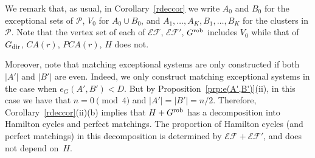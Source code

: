 \documentclass{memo-l}
\def\cP{\mathcal{P}}
\numberwithin{section}{chapter}
\numberwithin{equation}{section}
\numberwithin{firstthm}{section}
\numberwithin{figure}{section}
\begin{document}
We remark that, as usual, in Corollary~\ref{rdeccor} we write $A_0$ and $B_0$ for the exceptional sets of $\cP$, $V_0$ for $A_0\cup B_0$, and
$A_1,\dots,A_K,B_1,\dots,B_K$ for the clusters in $\cP$. Note that the vertex set of each of $\mathcal{EF}$, $\mathcal{EF}'$, $G^{\rm rob}$
includes $V_0$ while that of $G_{\rm dir}$, $CA(r)$, $PCA(r)$, $H$ does not.

Moreover, note that matching exceptional systems are only constructed if both $|A'|$ and $|B'|$ are even.
Indeed, we only construct matching exceptional systems in the case when $e_G(A',B')  < D$.
But by Proposition~\ref{prp:e(A',B')}(ii), in this case we have that $n = 0 \pmod4$ and $|A'| = |B'| = n/2$.
Therefore, Corollary~\ref{rdeccor}(ii)(b) implies that $H+ G^{\rm rob}$ has a decomposition into Hamilton cycles and perfect matchings.
The proportion of Hamilton cycles (and perfect matchings) in this decomposition is determined by $\mathcal{EF}+ \mathcal{EF}'$, 
and does not depend on~$H$.
\end{document}
